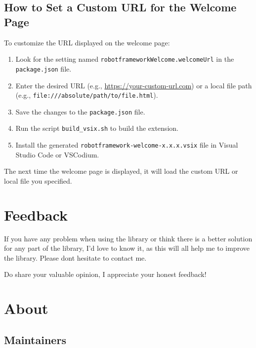 \subsection{How to Set a Custom URL for the Welcome Page}

To customize the URL displayed on the welcome page:

\begin{enumerate}
    \item Look for the setting named \texttt{robotframeworkWelcome.welcomeUrl} in the \texttt{package.json} file.
    \item Enter the desired URL (e.g., \url{https://your-custom-url.com}) or a local file path (e.g., \texttt{file:///absolute/path/to/file.html}).
    \item Save the changes to the \texttt{package.json} file.
    \item Run the script \texttt{build\_vsix.sh} to build the extension.
    \item Install the generated \texttt{robotframework-welcome-x.x.x.vsix} file in Visual Studio Code or VSCodium.
\end{enumerate}

The next time the welcome page is displayed, it will load the custom URL or local file you specified.

\hypertarget{description-feedback}{%
\section{Feedback}\label{description-feedback}}

If you have any problem when using the library or think there is a
better solution for any part of the library, I'd love to know it, as
this will all help me to improve the library. Please
don\textquotesingle t hesitate to contact me.

Do share your valuable opinion, I appreciate your honest feedback!

\hypertarget{description-about}{%
\section{About}\label{description-about}}

\hypertarget{description-maintainers}{%
\subsection{Maintainers}\label{description-maintainers}}

